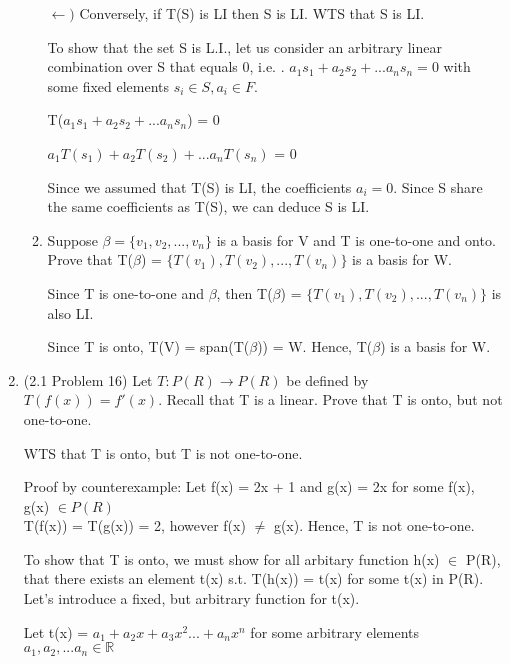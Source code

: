 \documentclass[12pt]{article}
\begin{document}
\begin{enumerate}
\begin{enumerate}[label=(\alph*)]
            $\leftarrow)$ Conversely, if T(S) is LI then S is LI.
            WTS that S is LI. 

            
            To show that the set S is L.I., let us consider an arbitrary linear combination over S that equals 0, i.e. . $a_1s_1 + a_2s_2 + ... a_ns_n = 0$ with some fixed elements $s_i \in S, a_i \in F$.

            T($a_1s_1 + a_2s_2 + ... a_ns_n$) = 0

            $a_1T(s_1) + a_2T(s_2) + ... a_nT(s_n)$ = 0

            Since we assumed that T(S) is LI, the coefficients $a_i = 0$. Since S share the same coefficients as T(S), we can deduce S is LI. 

            \qedsymbol{}

            \item Suppose $\beta = \{v_1, v_2, ...,v_n\}$ is a basis for V and T is one-to-one and onto. Prove that T($\beta$) = $\{T(v_1), T(v_2),...,T(v_n)\}$ is a basis for W. 

            Since T is one-to-one and $\beta$, then T($\beta$) = $\{T(v_1), T(v_2),...,T(v_n)\}$ is also LI. 

            Since T is onto, T(V) = span(T($\beta$)) = W. 
            Hence, T($\beta$) is a basis for W. 
            \qedsymbol{}
            
        \end{enumerate} 

    \item (2.1 Problem 16) Let $T:P(R) \xrightarrow{} P(R)$ be defined by $T(f(x)) = f'(x)$. Recall that T is a linear. Prove that T is onto, but not one-to-one.

    WTS that T is onto, but T is not one-to-one. 
    
    Proof by counterexample: 
    Let f(x) = 2x + 1 and g(x) = 2x for some f(x), g(x) $\in P(R)$ \\
    T(f(x)) = T(g(x)) = 2, however f(x) $\neq$ g(x). 
    Hence, T is not one-to-one. 

    To show that T is onto, we must show for all arbitary function h(x) $\in$ P(R), that there exists an element t(x) s.t. T(h(x)) = t(x) for some t(x) in P(R). Let's introduce a fixed, but arbitrary function for t(x). 
    
    Let t(x) = $a_1 + a_2x + a_3x^2... + a_nx^n$ for some arbitrary elements $a_1, a_2, ... a_n \in \mathbb{R}$\\


\end{enumerate}
\end{document}
